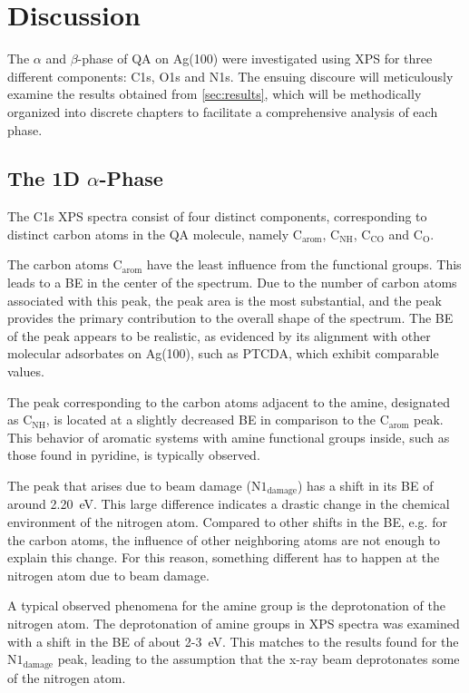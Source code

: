 \chapter{Discussion}

The $\alpha$ and $\beta$-phase of \ac{QA} on Ag(100) were investigated using \ac{XPS} for three different components: C1s, O1s and N1s. The ensuing discoure will meticulously examine the results obtained from \autoref{sec:results}, which will be methodically organized into discrete chapters to facilitate a comprehensive analysis of each phase.


\section{The 1D \texorpdfstring{$\alpha$}{alpha}-Phase}

The C1s \ac{XPS} spectra consist of four distinct components, corresponding to distinct carbon atoms in the \ac{QA} molecule, namely  $\mathrm{C_{arom}}$,  $\mathrm{C_{NH}}$,  $\mathrm{C_{CO}}$ and  $\mathrm{C_{O}}$.

The carbon atoms $\mathrm{C_{arom}}$ have the least influence from the functional groups. This leads to a \ac{BE} in the center of the spectrum. Due to the number of carbon atoms associated with this peak, the peak area is the most substantial, and the peak provides the primary contribution to the overall shape of the spectrum. The \ac{BE} of the peak appears to be realistic, as evidenced by its alignment with other molecular adsorbates on Ag(100), such as \ac{PTCDA}, which exhibit comparable values.\autocite{Bauer2014}

The peak corresponding to the carbon atoms adjacent to the amine, designated as $\mathrm{C_{NH}}$, is located at a slightly decreased \ac{BE} in comparison to the $\mathrm{C_{arom}}$ peak. This behavior of aromatic systems with amine functional groups inside, such as those found in pyridine, is typically observed.\autocite{Mendolicchio2019, Bagus2025}

The peak that arises due to beam damage ($\mathrm{N1_{damage}}$) has a shift in its \ac{BE} of around 2.20~\si{\eV}. This large difference indicates a drastic change in the chemical environment of the nitrogen atom. Compared to other shifts in the \ac{BE}, e.g. for the carbon atoms, the influence of other neighboring atoms are not enough to explain this change. For this reason, something different has to happen at the nitrogen atom due to beam damage.

A typical observed phenomena for the amine group is the deprotonation of the nitrogen atom. The deprotonation of amine groups in \ac{XPS} spectra was examined with a shift in the \ac{BE} of about 2-3~\si{\eV}.\autocite{Kang1990, Ruano2021}  This matches to the results found for the $\mathrm{N1_{damage}}$ peak, leading to the assumption that the x-ray beam deprotonates some of the nitrogen atom.


